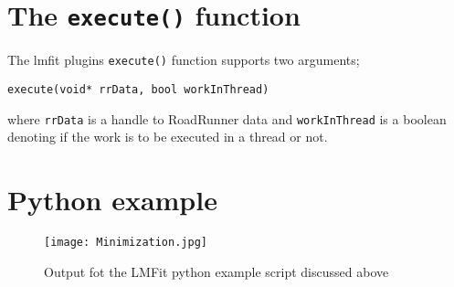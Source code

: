 \section{The \texttt{execute()} function}
The lmfit plugins \verb|execute()| function supports two arguments;

\verb|execute(void* rrData, bool workInThread)|

where \verb|rrData| is a handle to RoadRunner data and \verb|workInThread| is a boolean denoting if the work is to be executed in a thread or not.

\section{Python example}

\begin{singlespace}

\end{singlespace}

\begin{figure}[H]
\centering
\texttt{[image: Minimization.jpg]}
\caption{Output fot the LMFit python example script discussed above}
\label{fig:lmfitFig}
\end{figure}




